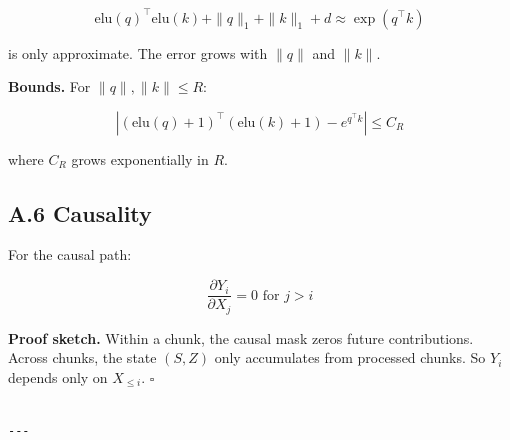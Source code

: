 \[
\text{elu}(q)^\top \text{elu}(k) + \|q\|_1 + \|k\|_1 + d \approx \exp(q^\top k)
\]

is only approximate. The error grows with $\|q\|$ and $\|k\|$.

\textbf{Bounds.} For $\|q\|, \|k\| \leq R$:

\[
\left|(\text{elu}(q)+1)^\top(\text{elu}(k)+1) - e^{q^\top k}\right| \leq C_R
\]

where $C_R$ grows exponentially in $R$.

\subsection{A.6 Causality}

For the causal path:

\[
\frac{\partial Y_i}{\partial X_j} = 0 \text{ for } j > i
\]

\textbf{Proof sketch.} Within a chunk, the causal mask zeros future contributions. 
Across chunks, the state $(S, Z)$ only accumulates from processed chunks. 
So $Y_i$ depends only on $X_{\leq i}$. $\square$
\begin{lstlisting}

---
\end{lstlisting}